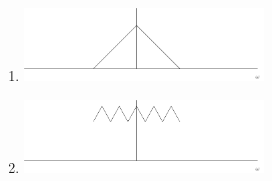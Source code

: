 \documentclass[journal,12pt,onecolumn]{IEEEtran}
\theoremstyle{remark}
\begin{document}
\begin{enumerate}
\begin{enumerate}
    \item 	 \begin{center}
\includegraphics[width=0.5\textwidth]{figs/fig8/fig8.4/main} %
\end{center}

    \item 	 \begin{center}
\includegraphics[width=0.5\textwidth]{figs/fig8/fig8.5/main} %
\end{center}\\


\end{enumerate}
\end{enumerate}
\end{document}
